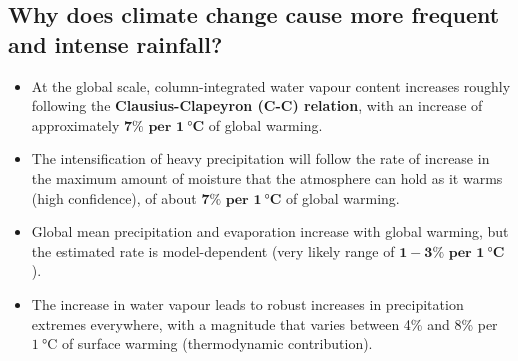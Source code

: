 \documentclass[11pt]{article}
\begin{document}
\subsection{Why does climate change cause more frequent and intense rainfall?}
\label{sec:orgbdc92cf}
\begin{itemize}
\item At the global scale, column-integrated water vapour content increases roughly following the \textbf{Clausius-Clapeyron (C-C) relation}, with an increase of approximately \(\boldsymbol{7\%} \textbf{ per } \boldsymbol{\qty{1}{\degreeCelsius}}\) of global warming.
\item The intensification of heavy precipitation will follow the rate of increase in the maximum amount of moisture that the atmosphere can hold as it warms (high confidence), of about \(\boldsymbol{7\%} \textbf{ per } \boldsymbol{\qty{1}{\degreeCelsius}}\) of global warming.
\item Global mean precipitation and evaporation increase with global warming, but the estimated rate is model-dependent (very likely range of \(\boldsymbol{1 - 3\%} \textbf{ per } \boldsymbol{\qty{1}{\degreeCelsius}}\)).
\item The increase in water vapour leads to robust increases in precipitation extremes everywhere, with a magnitude that varies between 4\% and 8\% per \(\qty{1}{\degreeCelsius}\) of surface warming (thermodynamic contribution).
\end{itemize}

\newpage
\end{document}
